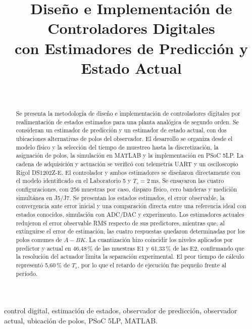 \documentclass[conference,10pt]{IEEEtran}
\title{Diseño e Implementación de Controladores Digitales\\
con Estimadores de Predicción y Estado Actual}
\author{\IEEEauthorblockN{Aldo Pastore}\\
\IEEEauthorblockA{Carrera de Ingeniería Electrónica\\
Universidad Católica ``Nuestra Señora de la Asunción''\\
Asignatura: Automatización --- Laboratorio N.\textsuperscript{o} 7\\
Docente: PhD. Enrique A. Vargas Cabral}}
\begin{document}
\maketitle
\begin{abstract}
Se presenta la metodología de diseño e implementación de controladores digitales
por realimentación de estados estimados para una planta analógica de segundo orden.
Se consideran un estimador de predicción y un estimador de estado actual, con dos
ubicaciones alternativas de polos del observador. El desarrollo se organiza desde
el modelo físico y la selección del tiempo de muestreo hasta la discretización,
la asignación de polos, la simulación en MATLAB y la implementación en PSoC 5LP.
La cadena de adquisición y actuación se verificó con telemetría UART y un
osciloscopio Rigol DS1202Z-E. El controlador y ambos estimadores se diseñaron
directamente con el modelo identificado en el Laboratorio 5 y
$T_s=\SI{2}{\milli\second}$. Se ensayaron las cuatro configuraciones, con 256
muestras por caso, disparo físico, cero
banderas y medición simultánea en J5/J7. Se presentan los estados estimados, el
error observable, la convergencia ante error inicial y una comparación directa
entre una referencia ideal con estados conocidos, simulación con ADC/DAC y
experimento. Los estimadores
actuales redujeron el error observable RMS respecto de sus predictores, mientras
que, al extinguirse el error de estimación, las cuatro respuestas quedaron
determinadas por los polos comunes de $A-BK$. La cuantización hizo coincidir los
niveles aplicados por predictor y actual en 46,48\,\% de las muestras E1 y
61,33\,\% de las E2, confirmando que la resolución del actuador limita la
separación experimental. El peor tiempo de cálculo representó 5,60\,\% de
$T_s$, por lo que el retardo de ejecución fue pequeño frente al período.
\end{abstract}
\begin{IEEEkeywords}
control digital, estimación de estados, observador de predicción,
observador actual, ubicación de polos, PSoC 5LP, MATLAB.
\end{IEEEkeywords}








\clearpage
\raggedbottom



\end{document}
